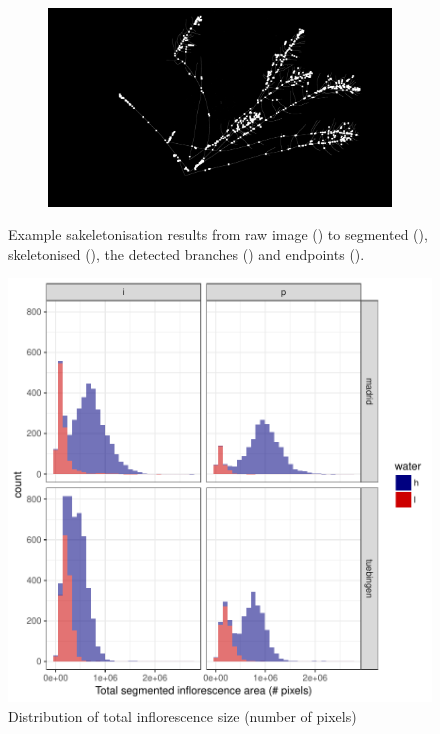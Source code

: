 \documentclass[12pt,]{article}
\begin{document}
\begin{figure}
\begin{subfigure}[t]{0.45\textwidth}
        \caption{} \label{fig:ep}
    \end{subfigure}
    \begin{subfigure}[t]{0.45\textwidth}
        \centering
        \includegraphics[width=\linewidth]{../figs/P1060902.JPG_proc_branches.jpeg}
        \caption{} \label{fig:bp}
    \end{subfigure}
\caption{Example sakeletonisation results from raw image () to segmented (), skeletonised (), the detected branches () and endpoints ().}
\label{fig:skeletonisation}
\end{figure}

\begin{figure}
    \centerline{\includegraphics[width=5in]{../figs/Figure_inflorescence_distribution.pdf}}
    \caption{ Distribution of total inflorescence size (number of pixels)}
    \label{fig:inflorescence}
\end{figure}
\end{document}
